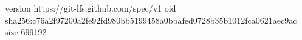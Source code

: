 version https://git-lfs.github.com/spec/v1
oid sha256:c76a2f97200a2fe92fd980bb5199458a0bbafed0728b35b1012fca0621aec9ac
size 699192
